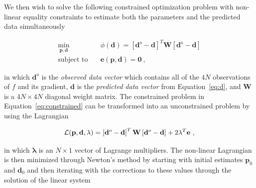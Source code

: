 We then wish to solve the following constrained optimization problem with
non-linear equality constraints to estimate both the parameters and the
predicted data simultaneously

\begin{equation}
  \begin{aligned}
    \min_{\mathbf{p}, \mathbf{d}} \quad &
      \phi(\mathbf{d}) =
      \left[\mathbf{d}^o - \mathbf{d}\right]^T \mathbf{W}
      \left[\mathbf{d}^o - \mathbf{d}\right]
    \\
    \textrm{subject to} \quad &
      \mathbf{e}(\mathbf{p}, \mathbf{d}) = \mathbf{0}
    \ ,
  \end{aligned}
  \label{eq:constrained}
\end{equation}

\noindent
in which $\mathbf{d}^o$ is the \textit{observed data vector} which contains all
of the $4N$ observations of $f$ and its gradient,
$\mathbf{d}$ is the \textit{predicted data vector} from Equation~\ref{eq:d},
and $\mathbf{W}$ is a $4N \times 4N$ diagonal weight matrix.
The constrained problem in Equation~\ref{eq:constrained} can be transformed
into an unconstrained problem by using the Lagrangian

\begin{equation}
  \operatorname{\mathcal{L}}(\mathbf{p}, \mathbf{d}, \mathbf{\lambda}) =
    \left[\mathbf{d}^o - \mathbf{d}\right]^T \mathbf{W}
    \left[\mathbf{d}^o - \mathbf{d}\right]
    +
    2 \mathbf{\lambda}^T \mathbf{e}
  \ ,
  \label{eq:lagrangian}
\end{equation}

\noindent
in which $\mathbf{\lambda}$ is an $N \times 1$ vector of Lagrange multipliers.
The non-linear Lagrangian is then minimized through Newton's method by starting
with initial estimates $\mathbf{p}_0$ and $\mathbf{d}_0$ and then iterating
with the corrections to these values through the solution of the linear system

